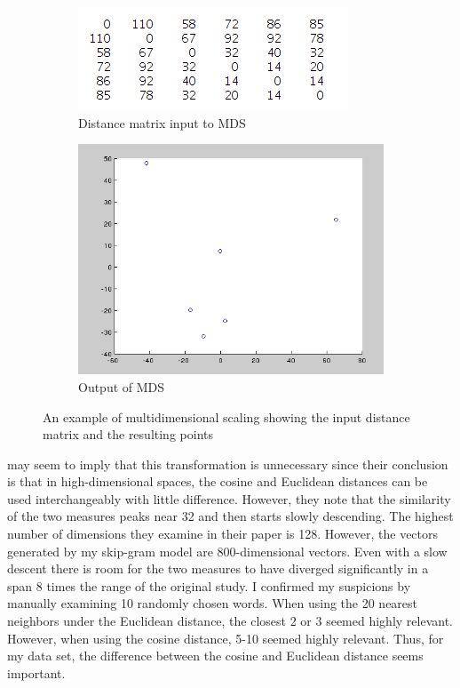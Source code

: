 \begin{figure}[tbp]
    \begin{subfigure}{.5\textwidth}
        \centering
        \includegraphics[width=.8\linewidth]{mds_example_input_matrix}
        \caption{Distance matrix input to MDS}
    \end{subfigure}
    \begin{subfigure}{.5\textwidth}
        \centering
        \includegraphics[width=.8\linewidth]{mds_example_output_plot}
        \caption{Output of MDS}
    \end{subfigure}

    \caption{An example of multidimensional scaling showing the input distance
    matrix and the resulting points}
    \label{fig:mdsexample}
\end{figure}


\citep{Qian2004} may seem to imply that this 
transformation is unnecessary since their conclusion is that in high-dimensional 
spaces, the cosine and Euclidean distances can be used interchangeably with 
little difference. However, they note that the similarity of the two measures 
peaks near 32 and then starts slowly 
descending. The highest number of dimensions they examine in their paper is 128. 
However, the vectors generated by my skip-gram model are 800-dimensional 
vectors. Even with a slow descent there is room for the two measures to have 
diverged significantly in a span 8 times the range of the original study. I 
confirmed my suspicions by manually examining 10 randomly chosen words. When 
using the 20 nearest neighbors under the Euclidean distance, the closest 2 or 3 
seemed highly relevant. However, when using the cosine distance, 5-10 seemed 
highly relevant. Thus, for my data set, the difference between the cosine and 
Euclidean distance seems important. 

